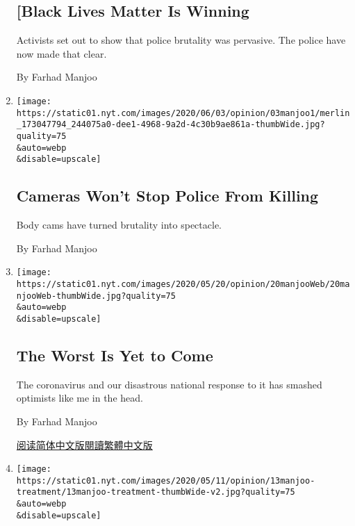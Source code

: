 \begin{enumerate}
  \hypertarget{black-lives-matter-is-winning}{%
  \subsection{{[}Black Lives Matter Is
  Winning}\label{black-lives-matter-is-winning}}

  Activists set out to show that police brutality was pervasive. The
  police have now made that clear.

  By Farhad Manjoo
\item
  \href{/2020/06/03/opinion/george-floyd-video-police.html}{}

  \texttt{[image: https://static01.nyt.com/images/2020/06/03/opinion/03manjoo1/merlin\_173047794\_244075a0-dee1-4968-9a2d-4c30b9ae861a-thumbWide.jpg?quality=75\\\&auto=webp\\\&disable=upscale]}

  \hypertarget{cameras-wont-stop-police-from-killing}{%
  \subsection{Cameras Won't Stop Police From
  Killing}\label{cameras-wont-stop-police-from-killing}}

  Body cams have turned brutality into spectacle.

  By Farhad Manjoo
\item
  \href{/2020/05/20/opinion/coronavirus-worst-case.html}{}

  \texttt{[image: https://static01.nyt.com/images/2020/05/20/opinion/20manjooWeb/20manjooWeb-thumbWide.jpg?quality=75\\\&auto=webp\\\&disable=upscale]}

  \hypertarget{the-worst-is-yet-to-come}{%
  \subsection{The Worst Is Yet to Come}\label{the-worst-is-yet-to-come}}

  The coronavirus and our disastrous national response to it has smashed
  optimists like me in the head.

  By Farhad Manjoo

  \href{https://cn.nytimes.com/opinion/20200521/coronavirus-worst-case/}{阅读简体中文版}\href{https://cn.nytimes.com/opinion/20200521/coronavirus-worst-case/zh-hant/}{閱讀繁體中文版}
\item
  \href{/2020/05/13/opinion/inequality-san-francisco-coronavirus.html}{}

  \texttt{[image: https://static01.nyt.com/images/2020/05/11/opinion/13manjoo-treatment/13manjoo-treatment-thumbWide-v2.jpg?quality=75\\\&auto=webp\\\&disable=upscale]}


\end{enumerate}
